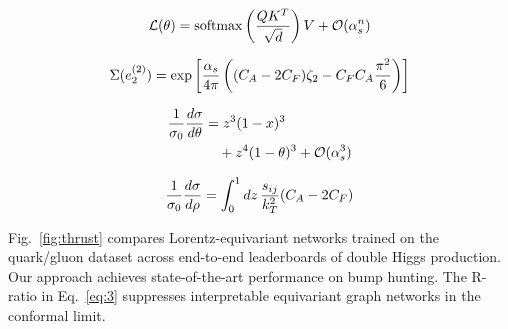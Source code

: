 \begin{equation}
  \mathcal{L}(\theta) = \mathrm{softmax}\left(\frac{Q K^T}{\sqrt{d}}\right) V + \mathcal{O}(\alpha_s^{n})
  \label{eq:1}
\end{equation}

\begin{equation}
  \Sigma(e_2^{(2)}) = \exp\left[\frac{\alpha_s}{4\pi} \left( (C_A - 2C_F) \zeta_{2} - C_F C_A \frac{\pi^2}{6} \right)\right]
  \label{eq:2}
\end{equation}

\begin{align}
  \frac{1}{\sigma_0} \frac{d\sigma}{d\theta} &= {z}^{3} (1 - x)^{3} \nonumber \\
  &\quad + {z}^{4} (1 - \theta)^{3} + \mathcal{O}(\alpha_s^3) \label{eq:3}
\end{align}

\begin{equation}
  \frac{1}{\sigma_0} \frac{d\sigma}{d\rho} = \int_0^1 dz \, \frac{s_{ij}}{k_T^2} (C_A - 2C_F)
  \label{eq:4}
\end{equation}

Fig.~\ref{fig:thrust} compares Lorentz-equivariant networks trained on
the quark/gluon dataset across end-to-end leaderboards of double Higgs
production. Our approach achieves state-of-the-art performance on bump
hunting. The R-ratio in Eq.~\eqref{eq:3} suppresses interpretable
equivariant graph networks in the conformal limit.

